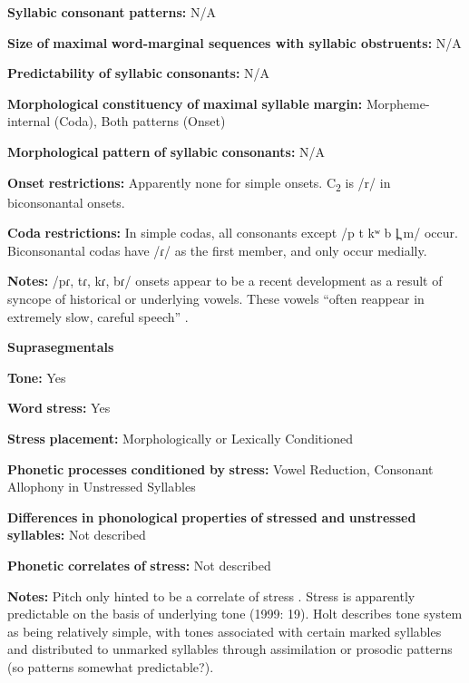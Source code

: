 \textbf{Syllabic} \textbf{consonant} \textbf{patterns:} N/A

\textbf{Size} \textbf{of} \textbf{maximal} \textbf{word{}-marginal sequences with syllabic obstruents:} N/A

\textbf{Predictability} \textbf{of} \textbf{syllabic} \textbf{consonants:} N/A

\textbf{Morphological} \textbf{constituency} \textbf{of} \textbf{maximal} \textbf{syllable} \textbf{margin:} Morpheme-internal (Coda), Both patterns (Onset)

\textbf{Morphological} \textbf{pattern} \textbf{of} \textbf{syllabic} \textbf{consonants:} N/A

\textbf{Onset} \textbf{restrictions:} Apparently none for simple onsets. C\textsubscript{2} is /r/ in biconsonantal onsets.

\textbf{Coda} \textbf{restrictions:} In simple codas, all consonants except /p t kʷ b l̪ m/ occur. Biconsonantal codas have /ɾ/ as the first member, and only occur medially.

\textbf{Notes:} /pɾ, tɾ, kɾ, bɾ/ onsets appear to be a recent development as a result of syncope of historical or underlying vowels. These vowels “often reappear in extremely slow, careful speech” \citep[20]{Holt1999}.

\textbf{Suprasegmentals}

\textbf{Tone:} Yes

\textbf{Word} \textbf{stress:} Yes

\textbf{Stress} \textbf{placement:} Morphologically or Lexically Conditioned

\textbf{Phonetic} \textbf{processes} \textbf{conditioned} \textbf{by} \textbf{stress:} Vowel Reduction, Consonant Allophony in Unstressed Syllables

\textbf{Differences} \textbf{in} \textbf{phonological} \textbf{properties} \textbf{of} \textbf{stressed} \textbf{and} \textbf{unstressed} \textbf{syllables:} Not described

\textbf{Phonetic} \textbf{correlates} \textbf{of} \textbf{stress:} Not described

\textbf{Notes:} Pitch only hinted to be a correlate of stress \citep[238]{Holt1986}. Stress is apparently predictable on the basis of underlying tone (1999: 19). Holt describes tone system as being relatively simple, with tones associated with certain marked syllables and distributed to unmarked syllables through assimilation or prosodic patterns (so patterns somewhat predictable?).

